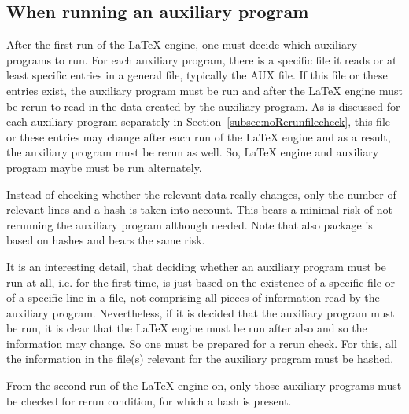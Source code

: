 \subsection{When running an auxiliary program}\label{subsec:firstRunAux}

After the first run of the \LaTeX{} engine, 
one must decide which auxiliary programs to run. 
For each auxiliary program, there is a specific file it reads 
or at least specific entries in a general file, typically the AUX file. 
If this file or these entries exist, the auxiliary program must be run 
and after the \LaTeX{} engine must be rerun 
to read in the data created by the auxiliary program. 
As is discussed for each auxiliary program separately 
in Section~\ref{subsec:noRerunfilecheck}, 
this file or these entries may change after each run of the \LaTeX{} engine 
and as a result, the auxiliary program must be rerun as well. 
So, \LaTeX{} engine and auxiliary program maybe must be run alternately. 

Instead of checking whether the relevant data really changes, 
only the number of relevant lines and a hash is taken into account. 
This bears a minimal risk of not rerunning the auxiliary program although needed. 
Note that also package  is based on hashes and bears the same risk. 

It is an interesting detail, 
that deciding whether an auxiliary program must be run at all, 
i.e. for the first time, 
is just based on the existence of a specific file 
or of a specific line in a file, 
not comprising all pieces of information read by the auxiliary program. 
Nevertheless, if it is decided that the auxiliary program must be run, 
it is clear that the \LaTeX{} engine must be run after also 
and so the information may change. 
So one must be prepared for a rerun check. 
For this, all the information in the file(s) relevant for the auxiliary program must be hashed. 

From the second run of the \LaTeX{} engine on, 
only those auxiliary programs must be checked for rerun condition, 
for which a hash is present. 
\medskip

